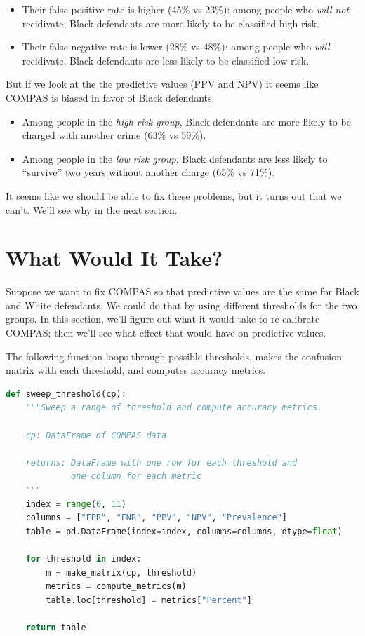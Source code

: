 \begin{itemize}
\item
  Their false positive rate is higher (45\% vs 23\%): among people who
  \emph{will not} recidivate, Black defendants are more likely to be
  classified high risk.
\item
  Their false negative rate is lower (28\% vs 48\%): among people who
  \emph{will} recidivate, Black defendants are less likely to be
  classified low risk.
\end{itemize}

But if we look at the the predictive values (PPV and NPV) it seems like
COMPAS is biased in favor of Black defendants:

\begin{itemize}
\item
  Among people in the \emph{high risk group}, Black defendants are more
  likely to be charged with another crime (63\% vs 59\%).
\item
  Among people in the \emph{low risk group}, Black defendants are less
  likely to ``survive'' two years without another charge (65\% vs 71\%).
\end{itemize}

It seems like we should be able to fix these problems, but it turns out
that we can't. We'll see why in the next section.

\section{What Would It Take?}\label{what-would-it-take}

Suppose we want to fix COMPAS so that predictive values are the same for
Black and White defendants. We could do that by using different
thresholds for the two groups. In this section, we'll figure out what it
would take to re-calibrate COMPAS; then we'll see what effect that would
have on predictive values.

The following function loops through possible thresholds, makes the
confusion matrix with each threshold, and computes accuracy metrics.

\begin{lstlisting}[language=Python,style=source]
def sweep_threshold(cp):
    """Sweep a range of threshold and compute accuracy metrics.

    cp: DataFrame of COMPAS data

    returns: DataFrame with one row for each threshold and
             one column for each metric
    """
    index = range(0, 11)
    columns = ["FPR", "FNR", "PPV", "NPV", "Prevalence"]
    table = pd.DataFrame(index=index, columns=columns, dtype=float)

    for threshold in index:
        m = make_matrix(cp, threshold)
        metrics = compute_metrics(m)
        table.loc[threshold] = metrics["Percent"]

    return table
\end{lstlisting}

